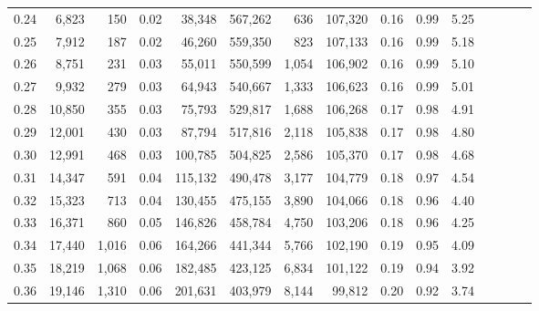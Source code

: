 \begin{tabular}{rrrcrrrrrrrrrrr}
0.24 &   6,823 &    150 &                                       0.02 &   38,348 &  567,262 &      636 &  107,320 &  0.16 &  0.99 &                         5.25 \\
0.25 &   7,912 &    187 &                                       0.02 &   46,260 &  559,350 &      823 &  107,133 &  0.16 &  0.99 &                         5.18 \\
0.26 &   8,751 &    231 &                                       0.03 &   55,011 &  550,599 &    1,054 &  106,902 &  0.16 &  0.99 &                         5.10 \\
0.27 &   9,932 &    279 &                                       0.03 &   64,943 &  540,667 &    1,333 &  106,623 &  0.16 &  0.99 &                         5.01 \\
0.28 &  10,850 &    355 &                                       0.03 &   75,793 &  529,817 &    1,688 &  106,268 &  0.17 &  0.98 &                         4.91 \\
0.29 &  12,001 &    430 &                                       0.03 &   87,794 &  517,816 &    2,118 &  105,838 &  0.17 &  0.98 &                         4.80 \\
0.30 &  12,991 &    468 &                                       0.03 &  100,785 &  504,825 &    2,586 &  105,370 &  0.17 &  0.98 &                         4.68 \\
0.31 &  14,347 &    591 &                                       0.04 &  115,132 &  490,478 &    3,177 &  104,779 &  0.18 &  0.97 &                         4.54 \\
0.32 &  15,323 &    713 &                                       0.04 &  130,455 &  475,155 &    3,890 &  104,066 &  0.18 &  0.96 &                         4.40 \\
0.33 &  16,371 &    860 &                                       0.05 &  146,826 &  458,784 &    4,750 &  103,206 &  0.18 &  0.96 &                         4.25 \\
0.34 &  17,440 &  1,016 &                                       0.06 &  164,266 &  441,344 &    5,766 &  102,190 &  0.19 &  0.95 &                         4.09 \\
0.35 &  18,219 &  1,068 &                                       0.06 &  182,485 &  423,125 &    6,834 &  101,122 &  0.19 &  0.94 &                         3.92 \\
0.36 &  19,146 &  1,310 &                                       0.06 &  201,631 &  403,979 &    8,144 &   99,812 &  0.20 &  0.92 &                         3.74 \\

\end{tabular}
